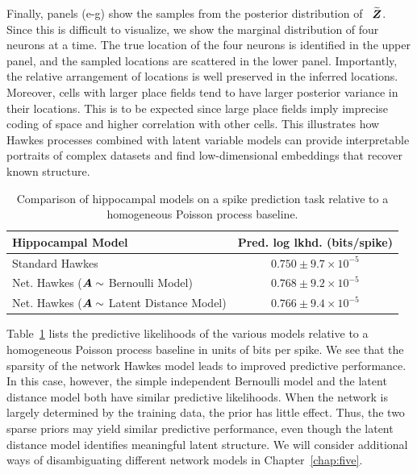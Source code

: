 Finally, panels (e-g) show the samples from the posterior distribution
of ~$\widetilde{\boldsymbol{Z}}$. Since this is difficult to visualize, we show
the marginal distribution of four neurons at a time. The true location
of the four neurons is identified in the upper panel, and the sampled
locations are scattered in the lower panel. Importantly, the relative
arrangement of locations is well preserved in the inferred locations.
Moreover, cells with larger place fields tend to have larger posterior
variance in their locations. This is to be expected since large place
fields imply imprecise coding of space and higher correlation with
other cells.  This illustrates how Hawkes processes combined with
latent variable models can provide interpretable portraits of complex
datasets and find low-dimensional embeddings that recover known
structure.

\begin{table}
  \begin{center}
    \begin{tabular}{l|c}
      \textbf{Hippocampal Model} & \textbf{Pred. log lkhd. (bits/spike)} \\
      \hline
      Standard Hawkes & $0.750 \pm 9.7 \times 10^{-5}$ \\
      Net. Hawkes ($\boldsymbol{A} \sim $ Bernoulli Model) & $0.768 \pm 9.2 \times 10^{-5}$ \\
      Net. Hawkes ($\boldsymbol{A} \sim $ Latent Distance Model) & $0.766 \pm 9.4\times 10^{-5}$ \\
    \end{tabular}
  \end{center}
    \caption{Comparison of hippocampal models on a spike prediction task relative to a homogeneous Poisson process baseline.}
    \label{tab:hipp_pred_ll}
\end{table}

Table~\ref{tab:hipp_pred_ll} lists the predictive likelihoods of the
various models relative to a homogeneous Poisson process baseline in
units of bits per spike. We see that the sparsity of the network Hawkes
model leads to improved predictive performance. In this case, however,
the simple independent Bernoulli model and the latent distance model
both have similar predictive likelihoods. When the network is largely
determined by the training data, the prior has little effect. Thus,
the two sparse priors may yield similar predictive performance, even though
the latent distance model identifies meaningful latent structure.
We will consider additional ways of disambiguating different network
models in Chapter~\ref{chap:five}.


